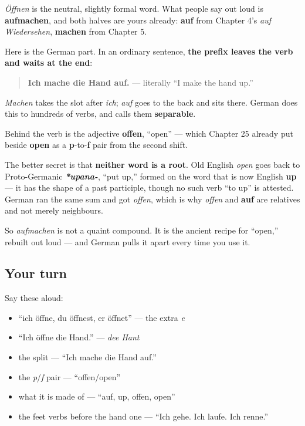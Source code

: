 \begin{grammarlens}[title={Grammar Lens: a verb that comes apart}]
\emph{Öffnen} is the neutral, slightly formal word. What people say out loud is \textbf{aufmachen}, and both halves are yours already: \textbf{auf} from Chapter 4's \emph{auf Wiedersehen}, \textbf{machen} from Chapter 5.

Here is the German part. In an ordinary sentence, \textbf{the prefix leaves the verb and waits at the end}:

\begin{quote}
\textbf{Ich mache die Hand auf.} — literally \textquotedblleft{}I make the hand up.\textquotedblright{}
\end{quote}

\emph{Machen} takes the slot after \emph{ich}; \emph{auf} goes to the back and sits there. German does this to hundreds of verbs, and calls them \textbf{separable}.
\end{grammarlens}

\begin{cousinweb}
Behind the verb is the adjective \textbf{offen}, \textquotedblleft{}open\textquotedblright{} — which Chapter 25 already put beside \textbf{open} as a \textbf{p}-to-\textbf{f} pair from the second shift.

The better secret is that \textbf{neither word is a root}. Old English \emph{open} goes back to Proto-Germanic \emph{\textbf{*upana-}}, \textquotedblleft{}put up,\textquotedblright{} formed on the word that is now English \textbf{up} — it has the shape of a past participle, though no such verb \textquotedblleft{}to up\textquotedblright{} is attested. German ran the same sum and got \emph{offen}, which is why \emph{offen} and \textbf{auf} are relatives and not merely neighbours.

So \emph{aufmachen} is not a quaint compound. It is the ancient recipe for \textquotedblleft{}open,\textquotedblright{} rebuilt out loud — and German pulls it apart every time you use it.
\end{cousinweb}

\subsection*{Your turn}
Say these aloud:

\begin{itemize}
\raggedright
  \item \textquotedblleft{}ich öffne, du öffnest, er öffnet\textquotedblright{} — the extra \emph{e}
  \item \textquotedblleft{}Ich öffne die Hand.\textquotedblright{} — \emph{dee Hant}
  \item the split — \textquotedblleft{}Ich mache die Hand auf.\textquotedblright{}
  \item the \emph{p}/\emph{f} pair — \textquotedblleft{}offen/open\textquotedblright{}
  \item what it is made of — \textquotedblleft{}auf, up, offen, open\textquotedblright{}
  \item the feet verbs before the hand one — \textquotedblleft{}Ich gehe. Ich laufe. Ich renne.\textquotedblright{}
\end{itemize}


